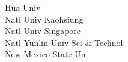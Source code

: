\documentclass[a4paper]{article}
\begin{document}
\begin{multicols*}{2}
\begin{footnotesize}
 Hua Univ \\ Natl Univ Kaohsiung \\ Natl Univ Singapore \\ Natl Yunlin Univ Sci \& Technol \\ New Mexico State Un
\end{footnotesize}
\end{multicols*}
\end{document}
